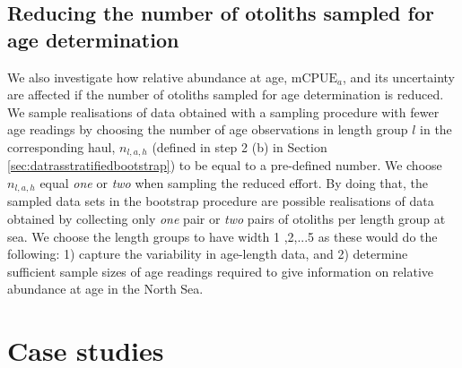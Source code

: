 \documentclass[a4paper 12pt]{article}
\numberwithin{equation}{section}
\begin{document}
\subsection{Reducing the number of otoliths sampled for age determination}
\label{sec:reducingeffort}
We also investigate how relative abundance at age, $\text{mCPUE}_a$, and its uncertainty are affected if the  number of otoliths sampled for age determination is reduced. We sample realisations of data obtained with a sampling procedure with fewer age readings by choosing the number of age observations in length group $l$ in the corresponding haul,  $n_{l,a,h}$ (defined in step 2 (b) in Section \ref{sec:datrasstratifiedbootstrap}) to be equal to a pre-defined number. We choose $n_{l,a,h}$ equal \textit{one} or \textit{two} when sampling the reduced effort. By doing that, the sampled data sets in the bootstrap procedure are possible realisations of data obtained by collecting only \textit{one} pair or \textit{two} pairs of otoliths per length group at sea. We choose the length groups to have width 1 ,2,...5 as these would do the following: 1) capture the variability in age-length data, and 2) determine sufficient sample sizes of age readings required to give information on relative abundance at age in the North Sea. 


\section{Case studies}
\label{sec:data}
\end{document}
